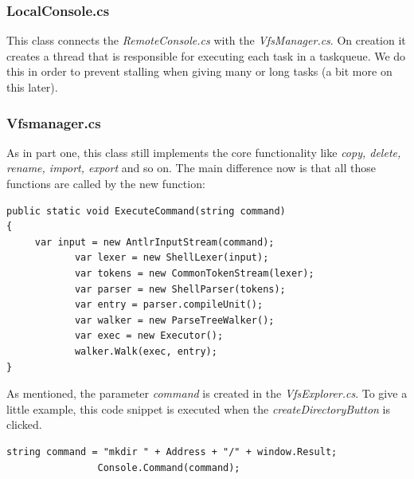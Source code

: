 \documentclass[a4paper,12pt]{article}
\begin{document}
\subsubsection{LocalConsole.cs}
This class connects the \emph{RemoteConsole.cs} with the \emph{VfsManager.cs}. On creation it creates a thread that is responsible for executing each task in a taskqueue. We do this in order to prevent stalling when giving many or long tasks (a bit more on this later).
\subsubsection{Vfsmanager.cs}
As in part one, this class still implements the core functionality like \emph{copy, delete, rename, import, export } and so on. The main difference now is that all those functions are called by the new function: \\
\begin{lstlisting}[label={lst:1},caption=Command Execution]
public static void ExecuteCommand(string command)
{
	 var input = new AntlrInputStream(command);
            var lexer = new ShellLexer(input);
            var tokens = new CommonTokenStream(lexer);
            var parser = new ShellParser(tokens);
            var entry = parser.compileUnit();
            var walker = new ParseTreeWalker();
            var exec = new Executor();
            walker.Walk(exec, entry);
}
\end{lstlisting}
As mentioned, the parameter \emph{command} is created in the \emph{VfsExplorer.cs}. To give a little example, this code snippet is executed when the \emph{createDirectoryButton} is clicked.
\begin{lstlisting}[label={lst:2},caption=Command Creation]
                string command = "mkdir " + Address + "/" + window.Result;
                Console.Command(command);
\end{lstlisting}
\end{document}
